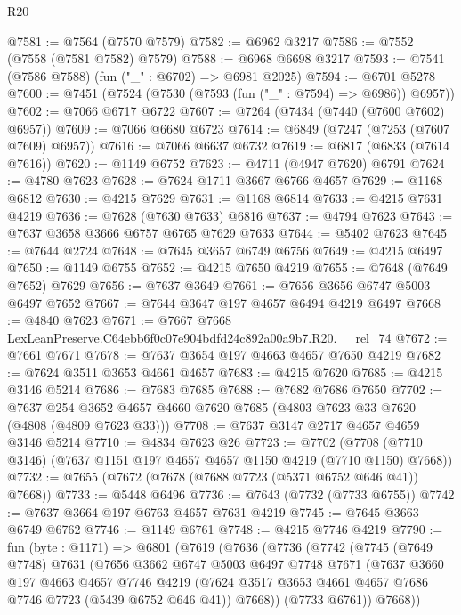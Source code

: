 \begin{lexlean}{R20}
\begin{coremodule}
@7581 := @7564 (@7570 @7579)
@7582 := @6962 @3217
@7586 := @7552 (@7558 (@7581 @7582) @7579)
@7588 := @6968 @6698 @3217
@7593 := @7541 (@7586 @7588) (fun ("_" : @6702) => @6981 @2025)
@7594 := @6701 @5278
@7600 := @7451 (@7524 (@7530 (@7593 (fun ("_" : @7594) => @6986)) @6957))
@7602 := @7066 @6717 @6722
@7607 := @7264 (@7434 (@7440 (@7600 @7602) @6957))
@7609 := @7066 @6680 @6723
@7614 := @6849 (@7247 (@7253 (@7607 @7609) @6957))
@7616 := @7066 @6637 @6732
@7619 := @6817 (@6833 (@7614 @7616))
@7620 := @1149 @6752
@7623 := @4711 (@4947 @7620) @6791
@7624 := @4780 @7623
@7628 := @7624 @1711 @3667 @6766 @4657
@7629 := @1168 @6812
@7630 := @4215 @7629
@7631 := @1168 @6814
@7633 := @4215 @7631 @4219
@7636 := @7628 (@7630 @7633) @6816
@7637 := @4794 @7623
@7643 := @7637 @3658 @3666 @6757 @6765 @7629 @7633
@7644 := @5402 @7623
@7645 := @7644 @2724
@7648 := @7645 @3657 @6749 @6756
@7649 := @4215 @6497
@7650 := @1149 @6755
@7652 := @4215 @7650 @4219
@7655 := @7648 (@7649 @7652) @7629
@7656 := @7637 @3649
@7661 := @7656 @3656 @6747 @5003 @6497 @7652
@7667 := @7644 @3647 @197 @4657 @6494 @4219 @6497
@7668 := @4840 @7623
@7671 := @7667 @7668 LexLeanPreserve.C64ebb6f0c07e904bdfd24c892a00a9b7.R20.__rel_74
@7672 := @7661 @7671
@7678 := @7637 @3654 @197 @4663 @4657 @7650 @4219
@7682 := @7624 @3511 @3653 @4661 @4657
@7683 := @4215 @7620
@7685 := @4215 @3146 @5214
@7686 := @7683 @7685
@7688 := @7682 @7686 @7650
@7702 := @7637 @254 @3652 @4657 @4660 @7620 @7685 (@4803 @7623 @33 @7620 (@4808 (@4809 @7623 @33)))
@7708 := @7637 @3147 @2717 @4657 @4659 @3146 @5214
@7710 := @4834 @7623 @26
@7723 := @7702 (@7708 (@7710 @3146) (@7637 @1151 @197 @4657 @4657 @1150 @4219 (@7710 @1150) @7668))
@7732 := @7655 (@7672 (@7678 (@7688 @7723 (@5371 @6752 @646 @41)) @7668))
@7733 := @5448 @6496
@7736 := @7643 (@7732 (@7733 @6755))
@7742 := @7637 @3664 @197 @6763 @4657 @7631 @4219
@7745 := @7645 @3663 @6749 @6762
@7746 := @1149 @6761
@7748 := @4215 @7746 @4219
@7790 := fun (byte : @1171) =>
  @6801
    (@7619
      (@7636
        (@7736
          (@7742
            (@7745
              (@7649 @7748)
              @7631
              (@7656
                @3662
                @6747
                @5003
                @6497
                @7748
                @7671
                (@7637
                  @3660
                  @197
                  @4663
                  @4657
                  @7746
                  @4219
                  (@7624 @3517 @3653 @4661 @4657 @7686 @7746 @7723 (@5439 @6752 @646 @41))
                  @7668))
              (@7733 @6761))
            @7668))

\end{coremodule}
\end{lexlean}
